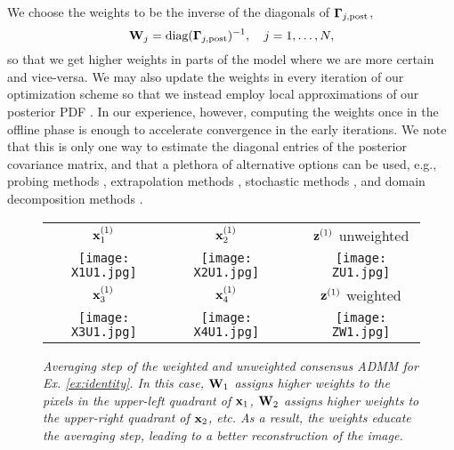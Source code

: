 \documentclass[11pt]{article}          %
\newcommand{\bfW}{{\bf W}}
\newcommand{\bfx}{{\bf  x}}
\newcommand{\bfz}{{\bf z}}
\newcommand{\bfGamma}{\boldsymbol{\Gamma}}
\begin{document}
We choose the weights to be the inverse of the diagonals of $\bfGamma_{j, \rm post}$, 
\begin{equation}
  \bfW_j = \text{diag}(\bfGamma_{j, \rm post})^{-1}, \quad j=1,\ldots,N,
\end{equation}
so that we get higher weights in parts of the model where we are more certain and vice-versa. We may also update the weights in every iteration of our optimization scheme so that we instead employ local approximations of our posterior PDF \cite{bui2013computational}. In our experience, however, computing the weights once in the offline phase is enough to accelerate convergence in the early iterations. We note that this is only one way to estimate the diagonal entries of the posterior covariance matrix, and that a plethora of alternative options can be used, e.g., probing methods \cite{tang2012probing}, extrapolation methods \cite{fika2018estimating}, stochastic methods \cite{bekas2007estimator}, and domain decomposition methods \cite{lin2009fast,tang2011domain,li2008computing}. 
  \begin{figure}[t]
    \centering
    \begin{tabular}{cccc}
      $\bfx_1^{(1)}$ & $\bfx_2^{(1)}$ & & $\bfz^{(1)}$ unweighted
      \\
      \texttt{[image: X1U1.jpg]}
      &
      \texttt{[image: X2U1.jpg]}
      &
      &
      \texttt{[image: ZU1.jpg]}
      \\
      $\bfx_3^{(1)}$ & $\bfx_4^{(1)}$ & & $\bfz^{(1)}$ weighted
      \\
      \texttt{[image: X3U1.jpg]}
      &
      \texttt{[image: X4U1.jpg]}
      &
      &
      \texttt{[image: ZW1.jpg]}
    \end{tabular}
    \caption{\textit{Averaging step of the weighted and unweighted consensus ADMM for Ex. \ref{ex:identity}. In this case, $\bfW_1$ assigns higher weights to the pixels in the upper-left quadrant of $\bfx_1$, $\bfW_2$ assigns higher weights to the upper-right quadrant of $\bfx_2$, etc. As a result, the weights educate the averaging step, leading to a better reconstruction of the image.}}
    \label{fig:identityExampleWeighted}
    \vspace{-5mm}
\end{figure}
\end{document}
